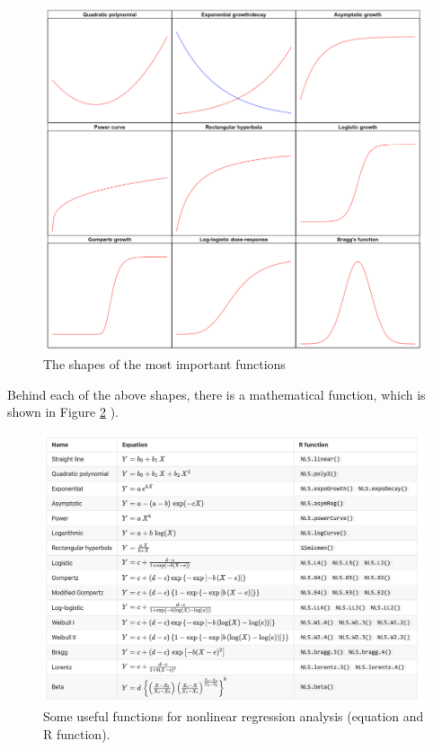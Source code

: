 \documentclass[a4paper,12pt,oneside]{book}
\begin{document}
\begin{figure}

{\centering \includegraphics[width=0.95\linewidth]{_images/nonLinearCurves} 

}

\caption{The shapes of the most important functions}\label{fig:figName151}
\end{figure}

Behind each of the above shapes, there is a mathematical function, which is shown in Figure \ref{fig:figName151bis} ).

\begin{figure}

{\centering \includegraphics[width=0.95\linewidth]{_images/nonLinearEquations} 

}

\caption{Some useful functions for nonlinear regression analysis (equation and R function).}\label{fig:figName151bis}
\end{figure}
\end{document}
